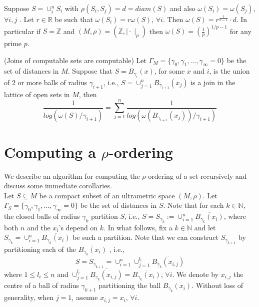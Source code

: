 \begin{corollary*}
	Suppose $S = \cup_i^n S_i$ with $\rho(S_i, S_j)=d=diam(S)$ and also $\omega(S_i)=\omega(S_j)$, $\forall i,j$ .  Let $r \in \mathbb{R}$ be such that $\omega(S_i)=r\omega(S)$, $\forall i$. Then $\omega(S) = r^{\frac{1}{n-1}}\cdot d$. In particular if $S = \mathbb{Z}$ and $(M,\rho)= (\mathbb{Z}, \mid \cdot\mid_p)$ then $\omega(S)=(\frac{1}{p})^{1/p-1}$ for any prime $p$. 
\end{corollary*}

\begin{corollary*}
	(Joins of computable sets are computable) Let  $\Gamma_M = \{\gamma_0, \gamma_1,\ldots, \gamma_\infty=0\}$ be the set of distances in $M$. Suppose that $S = B_{\gamma_i}(x)$,  for some $x$ and $i$, is the union of $2$ or more balls of radius $\gamma_{i+1}$, i.e., $S=\cup_{j=1}^n B_{\gamma_{i+1}} (x_j)$ is a join in the lattice of open sets in $M$, then 
	\[\frac{1}{log(\omega(S)/\gamma_{i+1} )} = \sum_{j=1}^n \frac{1}{log(\omega(B_{\gamma_{i+1}}(x_j))/\gamma_{i+1} )}\]
\end{corollary*}

\newpage
\section*{Computing a $\rho$-ordering}
We describe an algorithm for computing the $\rho$-ordering of a set recursively and discuss some immediate corollaries.  \\

Let $S \subseteq M$ be a compact subset of an ultrametric space $(M, \rho)$. Let $\Gamma_S =\{\gamma_0, \gamma_1,\ldots,\gamma_\infty=0\}$ be the set of distances in $S$.  Note that for each $k \in \mathbb{N}$, the closed balls of radius $\gamma_k$ partition $S$, i.e., $S=S_{\gamma_k} := \cup_{i=1}^n \overline{B_{\gamma_k}(x_i)}$, where both $n$ and the $x_i$'s depend on $k$. In what follows, fix a $k \in \mathbb{N}$ and let $S_{\gamma_k} = \cup_{i=1}^n \overline{B_{\gamma_k}(x_i)}$ be such a partition. Note that we can construct $S_{\gamma_{k+1}}$ by partitioning each of the $\overline{B_{\gamma_k}(x_i)}$ , i.e., \[S = S_{\gamma_{k+1}} = \cup_{i=1}^n \cup_{j=1}^{l_i} \overline{B_{\gamma_k}(x_{i,j})}\] where $1 \leq l_i \leq n$ and $\cup_{j=1}^{l_i} \overline{B_{\gamma_k}(x_{i,j})}=\overline{B_{\gamma_k}(x_i)}$, $\forall i$. We denote by $x_{i,j}$ the centre of a ball of radius $\gamma_{k+1}$ partitioning the ball $B_{\gamma_k}(x_i)$. Without loss of generality, when $j=1$, assume $x_{i,j}=x_i$, $\forall i$.\\

